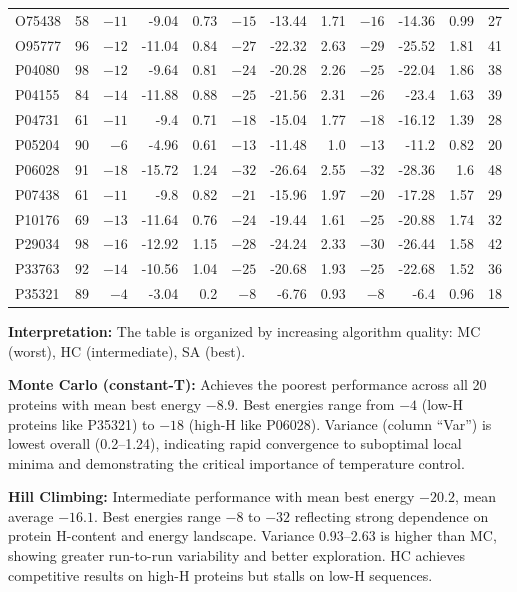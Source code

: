 \begin{table}[!htbp]
\begin{tabular}{lrrrrrrrrrrr}
O75438 & 58 & $-11$ & -9.04 & 0.73 & $-15$ & -13.44 & 1.71 & $-16$ & -14.36 & 0.99 & 27 \\
O95777 & 96 & $-12$ & -11.04 & 0.84 & $-27$ & -22.32 & 2.63 & $-29$ & -25.52 & 1.81 & 41 \\
P04080 & 98 & $-12$ & -9.64 & 0.81 & $-24$ & -20.28 & 2.26 & $-25$ & -22.04 & 1.86 & 38 \\
P04155 & 84 & $-14$ & -11.88 & 0.88 & $-25$ & -21.56 & 2.31 & $-26$ & -23.4 & 1.63 & 39 \\
P04731 & 61 & $-11$ & -9.4 & 0.71 & $-18$ & -15.04 & 1.77 & $-18$ & -16.12 & 1.39 & 28 \\
P05204 & 90 & $-6$ & -4.96 & 0.61 & $-13$ & -11.48 & 1.0 & $-13$ & -11.2 & 0.82 & 20 \\
P06028 & 91 & $-18$ & -15.72 & 1.24 & $-32$ & -26.64 & 2.55 & $-32$ & -28.36 & 1.6 & 48 \\
P07438 & 61 & $-11$ & -9.8 & 0.82 & $-21$ & -15.96 & 1.97 & $-20$ & -17.28 & 1.57 & 29 \\
P10176 & 69 & $-13$ & -11.64 & 0.76 & $-24$ & -19.44 & 1.61 & $-25$ & -20.88 & 1.74 & 32 \\
P29034 & 98 & $-16$ & -12.92 & 1.15 & $-28$ & -24.24 & 2.33 & $-30$ & -26.44 & 1.58 & 42 \\
P33763 & 92 & $-14$ & -10.56 & 1.04 & $-25$ & -20.68 & 1.93 & $-25$ & -22.68 & 1.52 & 36 \\
P35321 & 89 & $-4$ & -3.04 & 0.2 & $-8$ & -6.76 & 0.93 & $-8$ & -6.4 & 0.96 & 18 \\
\hline
\end{tabular}
\end{table}
\FloatBarrier

\textbf{Interpretation:} The table is organized by increasing algorithm quality: MC (worst), HC (intermediate), SA (best). 

\textbf{Monte Carlo (constant-T):} Achieves the poorest performance across all 20 proteins with mean best energy $-8.9$. Best energies range from $-4$ (low-H proteins like P35321) to $-18$ (high-H like P06028). Variance (column ``Var'') is lowest overall (0.2--1.24), indicating rapid convergence to suboptimal local minima and demonstrating the critical importance of temperature control.

\textbf{Hill Climbing:} Intermediate performance with mean best energy $-20.2$, mean average $-16.1$. Best energies range $-8$ to $-32$ reflecting strong dependence on protein H-content and energy landscape. Variance 0.93--2.63 is higher than MC, showing greater run-to-run variability and better exploration. HC achieves competitive results on high-H proteins but stalls on low-H sequences.

